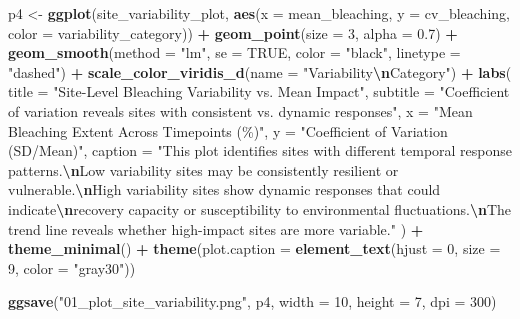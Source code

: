 \documentclass[
]{article}
\newenvironment{Shaded}{\begin{snugshade}}{\end{snugshade}}
\newcommand{\AttributeTok}[1]{\textcolor[rgb]{0.13,0.29,0.53}{#1}}
\newcommand{\ConstantTok}[1]{\textcolor[rgb]{0.56,0.35,0.01}{#1}}
\newcommand{\DecValTok}[1]{\textcolor[rgb]{0.00,0.00,0.81}{#1}}
\newcommand{\FloatTok}[1]{\textcolor[rgb]{0.00,0.00,0.81}{#1}}
\newcommand{\FunctionTok}[1]{\textcolor[rgb]{0.13,0.29,0.53}{\textbf{#1}}}
\newcommand{\NormalTok}[1]{#1}
\newcommand{\OtherTok}[1]{\textcolor[rgb]{0.56,0.35,0.01}{#1}}
\newcommand{\SpecialCharTok}[1]{\textcolor[rgb]{0.81,0.36,0.00}{\textbf{#1}}}
\newcommand{\StringTok}[1]{\textcolor[rgb]{0.31,0.60,0.02}{#1}}
\begin{document}
\begin{Shaded}
\begin{Highlighting}[]
\NormalTok{p4 }\OtherTok{\textless{}{-}} \FunctionTok{ggplot}\NormalTok{(site\_variability\_plot, }\FunctionTok{aes}\NormalTok{(}\AttributeTok{x =}\NormalTok{ mean\_bleaching, }\AttributeTok{y =}\NormalTok{ cv\_bleaching, }\AttributeTok{color =}\NormalTok{ variability\_category)) }\SpecialCharTok{+}
  \FunctionTok{geom\_point}\NormalTok{(}\AttributeTok{size =} \DecValTok{3}\NormalTok{, }\AttributeTok{alpha =} \FloatTok{0.7}\NormalTok{) }\SpecialCharTok{+}
  \FunctionTok{geom\_smooth}\NormalTok{(}\AttributeTok{method =} \StringTok{"lm"}\NormalTok{, }\AttributeTok{se =} \ConstantTok{TRUE}\NormalTok{, }\AttributeTok{color =} \StringTok{"black"}\NormalTok{, }\AttributeTok{linetype =} \StringTok{"dashed"}\NormalTok{) }\SpecialCharTok{+}
  \FunctionTok{scale\_color\_viridis\_d}\NormalTok{(}\AttributeTok{name =} \StringTok{"Variability}\SpecialCharTok{\textbackslash{}n}\StringTok{Category"}\NormalTok{) }\SpecialCharTok{+}
  \FunctionTok{labs}\NormalTok{(}
    \AttributeTok{title =} \StringTok{"Site{-}Level Bleaching Variability vs. Mean Impact"}\NormalTok{,}
    \AttributeTok{subtitle =} \StringTok{"Coefficient of variation reveals sites with consistent vs. dynamic responses"}\NormalTok{,}
    \AttributeTok{x =} \StringTok{"Mean Bleaching Extent Across Timepoints (\%)"}\NormalTok{,}
    \AttributeTok{y =} \StringTok{"Coefficient of Variation (SD/Mean)"}\NormalTok{,}
    \AttributeTok{caption =} \StringTok{"This plot identifies sites with different temporal response patterns.}\SpecialCharTok{\textbackslash{}n}\StringTok{Low variability sites may be consistently resilient or vulnerable.}\SpecialCharTok{\textbackslash{}n}\StringTok{High variability sites show dynamic responses that could indicate}\SpecialCharTok{\textbackslash{}n}\StringTok{recovery capacity or susceptibility to environmental fluctuations.}\SpecialCharTok{\textbackslash{}n}\StringTok{The trend line reveals whether high{-}impact sites are more variable."}
\NormalTok{  ) }\SpecialCharTok{+}
  \FunctionTok{theme\_minimal}\NormalTok{() }\SpecialCharTok{+}
  \FunctionTok{theme}\NormalTok{(}\AttributeTok{plot.caption =} \FunctionTok{element\_text}\NormalTok{(}\AttributeTok{hjust =} \DecValTok{0}\NormalTok{, }\AttributeTok{size =} \DecValTok{9}\NormalTok{, }\AttributeTok{color =} \StringTok{"gray30"}\NormalTok{))}

\FunctionTok{ggsave}\NormalTok{(}\StringTok{"01\_plot\_site\_variability.png"}\NormalTok{, p4, }\AttributeTok{width =} \DecValTok{10}\NormalTok{, }\AttributeTok{height =} \DecValTok{7}\NormalTok{, }\AttributeTok{dpi =} \DecValTok{300}\NormalTok{)}
\end{Highlighting}
\end{Shaded}
\end{document}
